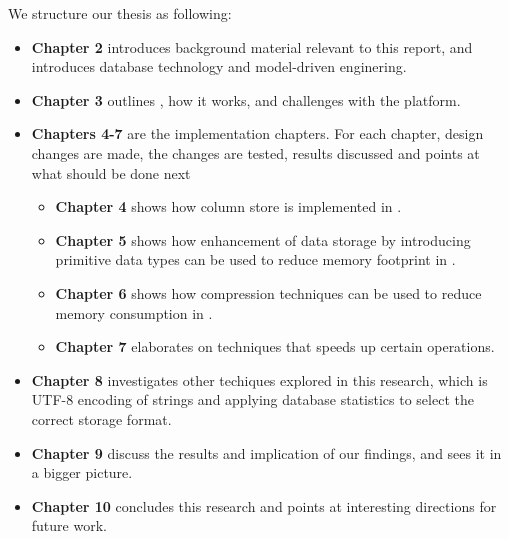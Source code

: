 We structure our thesis as following:
\begin{itemize}
  \item \textbf{Chapter 2} introduces background material relevant to this report, and introduces database technology and model-driven enginering. 
  \item \textbf{Chapter 3} outlines \gap, how it works, and challenges with the platform.
  \item \textbf{Chapters 4-7} are the implementation chapters. For each chapter, design changes are made, the changes are tested, results discussed and points at what should be done next
  \begin{itemize}
    \item \textbf{Chapter 4} shows how column store is implemented in \gap.
    \item \textbf{Chapter 5} shows how enhancement of data storage by introducing primitive data types can be used to reduce memory footprint in \gap.
    \item \textbf{Chapter 6} shows how compression techniques can be used to reduce memory consumption in \gap.
    \item \textbf{Chapter 7} elaborates on techniques that speeds up certain operations.
  \end{itemize}
  \item \textbf{Chapter 8} investigates other techiques explored in this research, which is UTF-8 encoding of strings and applying database statistics to select the correct storage format.
  \item \textbf{Chapter 9} discuss the results and implication of our findings, and sees it in a bigger picture.
  \item \textbf{Chapter 10} concludes this research and points at interesting directions for future work.
\end{itemize}






